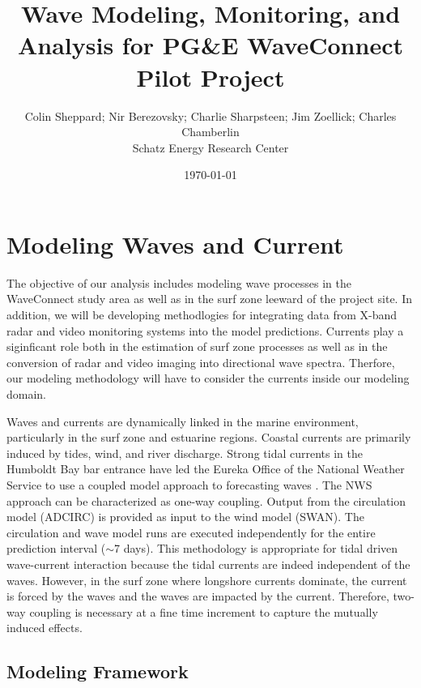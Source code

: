 \documentclass[11pt,letterpaper,oneside,reqno]{article}
\title{\bf Wave Modeling, Monitoring, and Analysis for PG\&E WaveConnect Pilot Project}
\author{Colin Sheppard; Nir Berezovsky; Charlie Sharpsteen; Jim Zoellick; Charles Chamberlin\\Schatz Energy Research Center}
\date{\today}
\begin{document}
\maketitle

\section{Modeling Waves and Current}

The objective of our analysis includes modeling wave processes in
the WaveConnect study area as well as in the surf zone leeward of
the project site. In addition, we will be developing methodlogies
for integrating data from X-band radar and video monitoring systems
into the model predictions. Currents play a siginficant role both
in the estimation of surf zone processes as well as in the
conversion of radar and video imaging into directional wave
spectra. Therfore, our modeling methodology will have to consider
the currents inside our modeling domain.

Waves and currents are dynamically linked in the marine
environment, particularly in the surf zone and estuarine regions.
Coastal currents are primarily induced by tides, wind, and river
discharge. Strong tidal currents in the Humboldt Bay bar entrance
have led the Eureka Office of the National Weather Service to use a
coupled model approach to forecasting waves \citep{nicolini2005}. The NWS
approach can be characterized as one-way coupling. Output from the
circulation model (ADCIRC) is provided as input to the wind model
(SWAN). The circulation and wave model runs are executed
independently for the entire prediction interval
(\ensuremath{\sim}7 days). This methodology is appropriate for
tidal driven wave-current interaction because the tidal currents
are indeed independent of the waves. However, in the surf zone
where longshore currents dominate, the current is forced by the
waves and the waves are impacted by the current. Therefore, two-way
coupling is necessary at a fine time increment to capture the
mutually induced effects.

\subsection{Modeling Framework}
\end{document}
